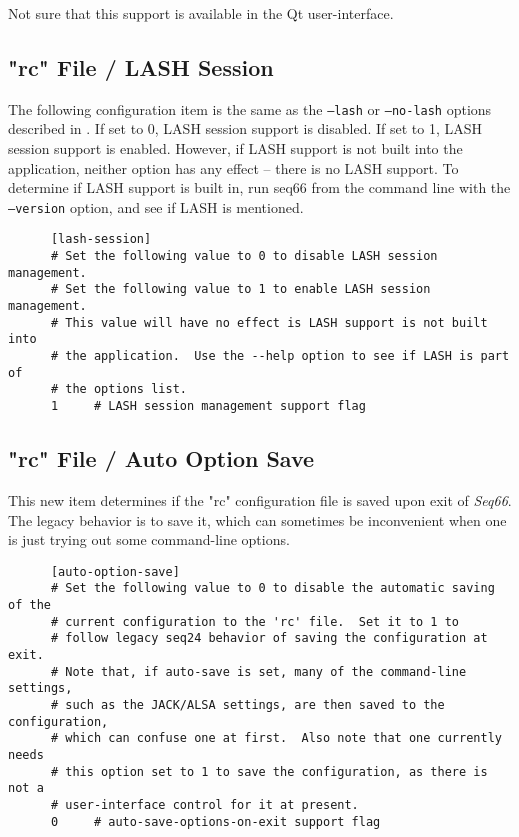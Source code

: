    Not sure that this support is available in the Qt user-interface.

\subsection{"rc" File / LASH Session}
\label{subsec:rc_file_lash_session}

   The following configuration item is the same as the
   \texttt{--lash} or \texttt{--no-lash} options described in
   .
   If set to 0, LASH session support is disabled.
   If set to 1, LASH session support is enabled.
   However, if LASH support is not built into the application, neither option
   has any effect -- there is no LASH support.  
   To determine if LASH support is built in, run seq66 from the command
   line with the \texttt{--version} option, and see if LASH is mentioned.

   \begin{verbatim}
      [lash-session]
      # Set the following value to 0 to disable LASH session management.
      # Set the following value to 1 to enable LASH session management.
      # This value will have no effect is LASH support is not built into
      # the application.  Use the --help option to see if LASH is part of
      # the options list.
      1     # LASH session management support flag
   \end{verbatim}

\subsection{"rc" File / Auto Option Save}
\label{subsec:rc_file_auto_rc_save}

   This new item determines if the "rc" configuration file is saved
   upon exit of \textsl{Seq66}.  The legacy behavior is to save it,
   which can sometimes be inconvenient when one is just trying out some
   command-line options.

   \begin{verbatim}
      [auto-option-save]
      # Set the following value to 0 to disable the automatic saving of the
      # current configuration to the 'rc' file.  Set it to 1 to
      # follow legacy seq24 behavior of saving the configuration at exit.
      # Note that, if auto-save is set, many of the command-line settings,
      # such as the JACK/ALSA settings, are then saved to the configuration,
      # which can confuse one at first.  Also note that one currently needs
      # this option set to 1 to save the configuration, as there is not a
      # user-interface control for it at present.
      0     # auto-save-options-on-exit support flag
   \end{verbatim}

